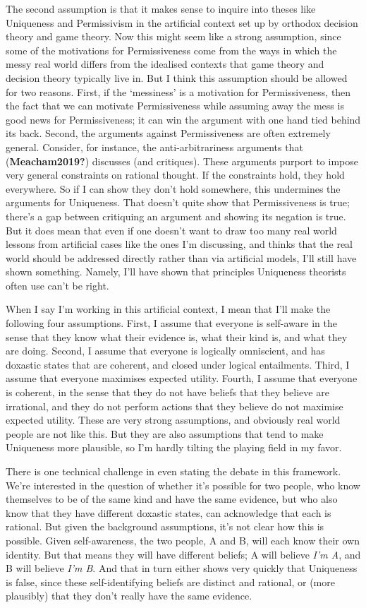 \documentclass[
  11pt,
]{article}
\begin{document}
The second assumption is that it makes sense to inquire into theses like Uniqueness and Permissivism in the artificial context set up by orthodox decision theory and game theory. Now this might seem like a strong assumption, since some of the motivations for Permissiveness come from the ways in which the messy real world differs from the idealised contexts that game theory and decision theory typically live in. But I think this assumption should be allowed for two reasons. First, if the `messiness' is a motivation for Permissiveness, then the fact that we can motivate Permissiveness while assuming away the mess is good news for Permissiveness; it can win the argument with one hand tied behind its back. Second, the arguments against Permissiveness are often extremely general. Consider, for instance, the anti-arbitrariness arguments that (\textbf{Meacham2019?}) discusses (and critiques). These arguments purport to impose very general constraints on rational thought. If the constraints hold, they hold everywhere. So if I can show they don't hold somewhere, this undermines the arguments for Uniqueness. That doesn't quite show that Permissiveness is true; there's a gap between critiquing an argument and showing its negation is true. But it does mean that even if one doesn't want to draw too many real world lessons from artificial cases like the ones I'm discussing, and thinks that the real world should be addressed directly rather than via artificial models, I'll still have shown something. Namely, I'll have shown that principles Uniqueness theorists often use can't be right.

When I say I'm working in this artificial context, I mean that I'll make the following four assumptions. First, I assume that everyone is self-aware in the sense that they know what their evidence is, what their kind is, and what they are doing. Second, I assume that everyone is logically omniscient, and has doxastic states that are coherent, and closed under logical entailments. Third, I assume that everyone maximises expected utility. Fourth, I assume that everyone is coherent, in the sense that they do not have beliefs that they believe are irrational, and they do not perform actions that they believe do not maximise expected utility. These are very strong assumptions, and obviously real world people are not like this. But they are also assumptions that tend to make Uniqueness more plausible, so I'm hardly tilting the playing field in my favor.

There is one technical challenge in even stating the debate in this framework. We're interested in the question of whether it's possible for two people, who know themselves to be of the same kind and have the same evidence, but who also know that they have different doxastic states, can acknowledge that each is rational. But given the background assumptions, it's not clear how this is possible. Given self-awareness, the two people, A and B, will each know their own identity. But that means they will have different beliefs; A will believe \emph{I'm A}, and B will believe \emph{I'm B}. And that in turn either shows very quickly that Uniqueness is false, since these self-identifying beliefs are distinct and rational, or (more plausibly) that they don't really have the same evidence.
\end{document}
